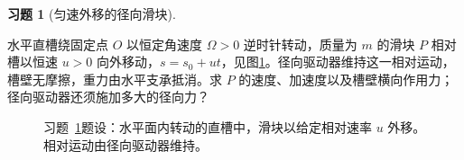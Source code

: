 \documentclass[11pt,openany,fontset=fandol]{ctexbook}
\theoremstyle{definition}\newtheorem{example}{例}[chapter]\newtheorem{exercise}{习题}[chapter]
\begin{document}
\par\medskip\noindent\begin{minipage}{\textwidth}
\begin{exercise}[匀速外移的径向滑块]\label{mp2:pr:l2p9}

水平直槽绕固定点 $O$ 以恒定角速度 $\Omega>0$ 逆时针转动，质量为 $m$ 的滑块 $P$ 相对槽以恒速 $u>0$ 向外移动，$s=s_0+ut$，见图\ref{mp2:fig:l2p9-q}。径向驱动器维持这一相对运动，槽壁无摩擦，重力由水平支承抵消。求 $P$ 的速度、加速度以及槽壁横向作用力；径向驱动器还须施加多大的径向力？

\end{exercise}

\begin{figure}[H]\centering
{}
\caption{习题~\ref{mp2:pr:l2p9}题设：水平面内转动的直槽中，滑块以给定相对速率 $u$ 外移。相对运动由径向驱动器维持。}\label{mp2:fig:l2p9-q}
\end{figure}
\end{minipage}\par\medskip
\end{document}
